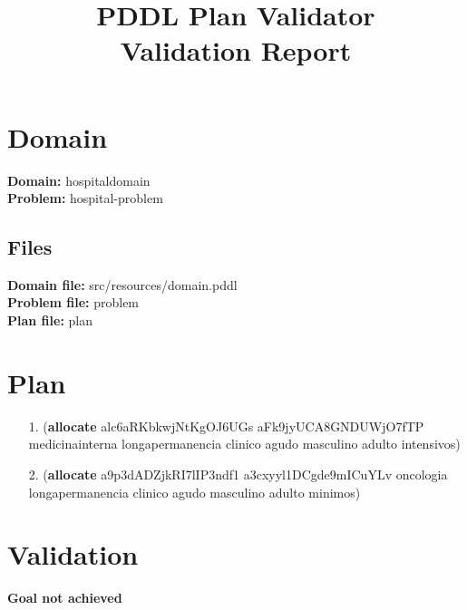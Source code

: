 \documentclass{article}
\title{\textbf{PDDL Plan Validator}\\Validation Report}
\date{} %
\begin{document}
\maketitle

\section{Domain}
\textbf{Domain:}  hospitaldomain\\
\textbf{Problem:} hospital-problem

\subsection{Files}
\textbf{Domain file:}  src/resources/domain.pddl \\
\textbf{Problem file:} problem\\
\textbf{Plan file:}    plan

\section{Plan}

\begin{itemize}
    \item[1.] (\textbf{allocate} alc6aRKbkwjNtKgOJ6UGs aFk9jyUCA8GNDUWjO7fTP medicinainterna longapermanencia clinico agudo masculino adulto intensivos)
    \item[2.] (\textbf{allocate} a9p3dADZjkRI7lIP3ndf1 a3cxyyl1DCgde9mICuYLv oncologia longapermanencia clinico agudo masculino adulto minimos)
\end{itemize}

\section{Validation}


\hline
\vspace{10pt}
\large \textbf{Goal not achieved}
\end{document}
